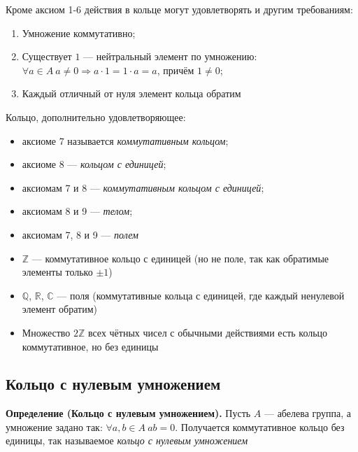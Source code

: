 \documentclass[a4paper,12pt]{article}
\theoremstyle{definition}
\theoremstyle{plain}
\theoremstyle{remark}
\begin{document}
	Кроме аксиом 1-6 действия в кольце могут удовлетворять и другим требованиям:
	\begin{enumerate}
		\item[7.] Умножение коммутативно;
		\item[8.] Существует $1$ — нейтральный элемент по умножению: $\forall a \in A \ a \neq 0 \Rightarrow a \cdot 1 = 1 \cdot a = a$, причём $1 \neq 0$;
		\item[9.] Каждый отличный от нуля элемент кольца обратим
	\end{enumerate}
	
	Кольцо, дополнительно удовлетворяющее:
	\begin{itemize}
		\item аксиоме 7 называется \textit{коммутативным кольцом};
		\item аксиоме 8 — \textit{кольцом с единицей};
		\item аксиомам 7 и 8 — \textit{коммутативным кольцом с единицей};
		\item аксиомам 8 и 9 — \textit{телом};
		\item аксиомам 7, 8 и 9 — \textit{полем}
	\end{itemize}
	
	\begin{tcolorbox}[colback=blue!5, colframe=blue!40!black, title=Базовые примеры колец]
		\begin{itemize}
			\item $\mathbb{Z}$ — коммутативное кольцо с единицей (но не поле, так как обратимые элементы только $\pm 1$)
			\item $\mathbb{Q}$, $\mathbb{R}$, $\mathbb{C}$ — поля (коммутативные кольца с единицей, где каждый ненулевой элемент обратим)
			\item Множество $2\mathbb{Z}$ всех чётных чисел с обычными действиями есть кольцо коммутативное, но без единицы
		\end{itemize}
	\end{tcolorbox}
	
	\subsection{Кольцо с нулевым умножением}
	
	\noindent \textbf{Определение (Кольцо с нулевым умножением).}
	Пусть $A$ — абелева группа, а умножение задано так: $\forall a, b \in A \ ab = 0$. Получается коммутативное кольцо без единицы, так называемое \textit{кольцо с нулевым умножением}
	
\end{document}
